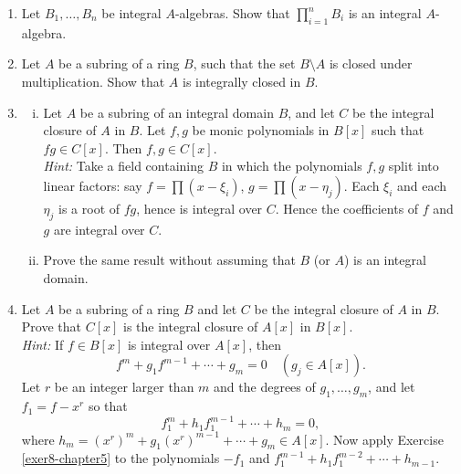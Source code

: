 \begin{enumerate}
    \item \label{exer6-chapter5}Let $B_1, \ldots, B_n$ be integral $A$-algebras. Show that $\prod_{i=1}^n B_i$ is an integral $A$-algebra.

    \item \label{exer7-chapter5}Let $A$ be a subring of a ring $B$, such that the set $B \setminus A$ is closed under multiplication. Show that $A$ is integrally closed in $B$.

    \item \label{exer8-chapter5} \begin{enumerate}[i)]
        \item Let $A$ be a subring of an integral domain $B$, and let $C$ be the integral closure of $A$ in $B$. Let $f, g$ be monic polynomials in $B[x]$ such that $fg \in C[x]$. Then $f, g \in C[x]$.\\
        \textit{Hint:} Take a field containing $B$ in which the polynomials $f, g$ split into linear factors: say $f = \prod (x - \xi_i)$, $g = \prod (x - \eta_j)$. Each $\xi_i$ and each $\eta_j$ is a root of $fg$, hence is integral over $C$. Hence the coefficients of $f$ and $g$ are integral over $C$.
        \item Prove the same result without assuming that $B$ (or $A$) is an integral domain.
    \end{enumerate}

    \item \label{exer9-chapter5}Let $A$ be a subring of a ring $B$ and let $C$ be the integral closure of $A$ in $B$. Prove that $C[x]$ is the integral closure of $A[x]$ in $B[x]$.\\
    \textit{Hint:} If $f \in B[x]$ is integral over $A[x]$, then
    \[
    f^m + g_1 f^{m-1} + \cdots + g_m = 0 \quad (g_j \in A[x]).
    \]
    Let $r$ be an integer larger than $m$ and the degrees of $g_1, \ldots, g_m$, and let $f_1 = f - x^r$ so that
    \[
    f_1^m + h_1 f_1^{m-1} + \cdots + h_m = 0,
    \]
    where $h_m = (x^r)^m + g_1(x^r)^{m-1} + \cdots + g_m \in A[x]$. Now apply Exercise \ref{exer8-chapter5} to the polynomials $-f_1$ and $f_1^{m-1} + h_1 f_1^{m-2} + \cdots + h_{m-1}$.


\end{enumerate}
